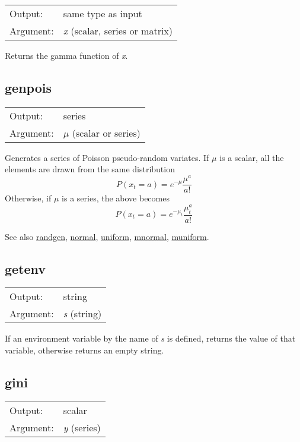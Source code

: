 \begin{tabular}{ll}
Output:     & same type as input\\
Argument:   & \textsl{x} (scalar, series or matrix)\\
\end{tabular}

	  Returns the gamma function of \textsl{x}. 

\subsection{genpois}
\hypertarget{func-genpois}{}

\begin{tabular}{ll}
Output:     & series\\
Argument:   & \textsl{$\mu$} (scalar or series)\\
\end{tabular}

	  Generates a series of Poisson pseudo-random variates. If $\mu$ is
	  a scalar, all the elements are drawn from the same distribution
	  \[ P(x_t = a) = e^{-\mu} \frac{\mu^{a}}{a!} \] 
	  Otherwise, if $\mu$ is a series, the above becomes 
	  \[ P(x_t = a) = e^{-\mu_t} \frac{\mu_t^{a}}{a!} \]

	  See also \hyperlink{func-randgen}{randgen}, \hyperlink{func-normal}{normal}, \hyperlink{func-uniform}{uniform}, \hyperlink{func-mnormal}{mnormal}, \hyperlink{func-muniform}{muniform}.

\subsection{getenv}
\hypertarget{func-getenv}{}

\begin{tabular}{ll}
Output:     & string\\
Argument:   & \textsl{s} (string)\\
\end{tabular}

	  If an environment variable by the name of \textsl{s}
	  is defined, returns the value of that variable, otherwise
	  returns an empty string.

\subsection{gini}
\hypertarget{func-gini}{}

\begin{tabular}{ll}
Output:     & scalar\\
Argument:   & \textsl{y} (series)\\
\end{tabular}


